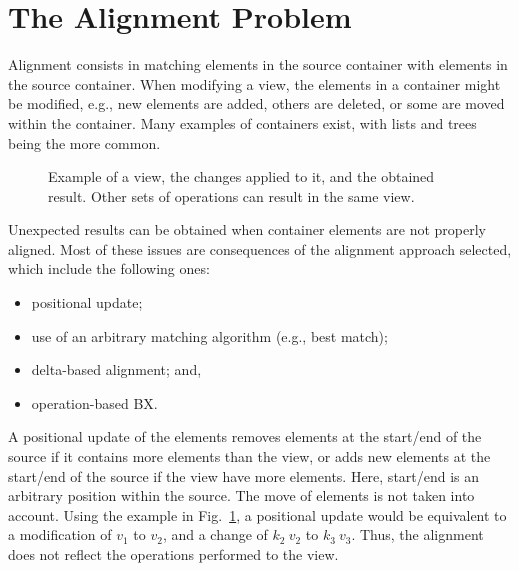 \documentclass[preprint,numbers]{sigplanconf}
\begin{document}


\section{The Alignment Problem}

Alignment consists in matching elements in the source container with elements in
the source container. When modifying a view, the elements in a container might
be modified, e.g., new elements are added, others are deleted, or some are moved
within the container. Many examples of containers exist, with lists and trees
being the more common.

\begin{figure}[ht]
  \centering
  
  \caption{Example of a view, the changes applied to it, and the obtained
  result. Other sets of operations can result in the same view.}
  \label{fig:alignment}
\end{figure}

Unexpected results can be obtained when container elements are not properly
aligned. Most of these issues are consequences of the alignment approach
selected, which include the following ones:
%
%
\begin{itemize}
  \item positional update;
  \item use of an arbitrary matching algorithm (e.g., best match);
  \item delta-based alignment; and,
  \item operation-based BX.
\end{itemize}

A positional update of the elements removes elements at the start/end of the source
if it contains more elements than the view, or adds new elements at the
start/end of the source if the view have more elements. Here, start/end is an
arbitrary position within the source. The move of elements is not taken into
account. Using the example in Fig.~\ref{fig:alignment}, a positional update
would be equivalent to a modification of \(v_1\) to \(v_2\), and a change of
\(k_2~v_2\) to \(k_3~v_3\). Thus, the alignment does not reflect the operations
performed to the view.
\end{document}

